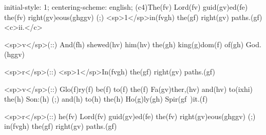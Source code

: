 initial-style: 1;
centering-scheme: english;
(c4)The(fv) Lord(fv) guid(gv)ed(fe) the(fv) right(gv)eous(ghggv) (;) <sp>1</sp>in(fvgh) the(gf) right(gv) paths.(gf) <c>ii.</c>

<sp>v</sp>(::) And(fh) shewed(hv) him(hv) the(gh) king(g)dom(f) of(gh) God.(hggv)

<sp>r</sp>(::) <sp>1</sp>In(fvgh) the(gf) right(gv) paths.(gf)

<sp>v</sp>(::) Glo(f)ry(f) be(f) to(f) the(f) Fa(gv)ther,(hv) and(hv) to(ixhi) the(h) Son:(h) (;) and(h) to(h) the(h) Ho(g)ly(gh) Spir(gf~)it.(f)

<sp>r</sp>(::) he(fv) Lord(fv) guid(gv)ed(fe) the(fv) right(gv)eous(ghggv) (;) in(fvgh) the(gf) right(gv) paths.(gf)
